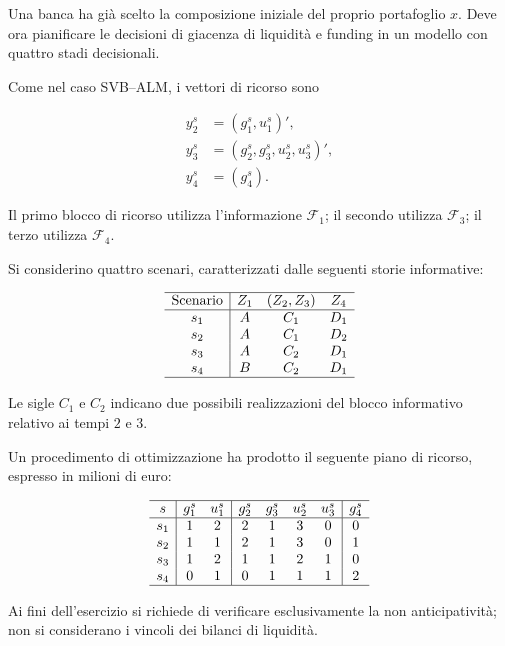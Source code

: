 \begin{exercise}

\label{ex:cap15-nonanticipativita-finanziaria}

Una banca ha gi\`a scelto la composizione
iniziale del proprio portafoglio $x$.
Deve ora pianificare le decisioni
di giacenza di liquidit\`a e funding
in un modello con quattro stadi decisionali.

Come nel caso SVB--ALM, i vettori
di ricorso sono

\[
\begin{aligned}
y_2^s
&=
(g_1^s,u_1^s)',
\\[4pt]
y_3^s
&=
(g_2^s,g_3^s,u_2^s,u_3^s)',
\\[4pt]
y_4^s
&=
(g_4^s).
\end{aligned}
\]

Il primo blocco di ricorso
utilizza l'informazione $\mathcal F_1$;
il secondo utilizza $\mathcal F_3$;
il terzo utilizza $\mathcal F_4$.

Si considerino quattro scenari,
caratterizzati dalle seguenti
storie informative:

\[
\begin{array}{c|ccc}
\hline
\text{Scenario}
&
Z_1
&
(Z_2,Z_3)
&
Z_4\\
\hline
s_1&A&C_1&D_1\\
s_2&A&C_1&D_2\\
s_3&A&C_2&D_1\\
s_4&B&C_2&D_1\\
\hline
\end{array}
\]

Le sigle $C_1$ e $C_2$ indicano
due possibili realizzazioni del blocco
informativo relativo ai tempi $2$ e $3$.

Un procedimento di ottimizzazione
ha prodotto il seguente piano
di ricorso, espresso in milioni di euro:

\[
\begin{array}{c|cc|cccc|c}
\hline
s
&
g_1^s&u_1^s
&
g_2^s&g_3^s&u_2^s&u_3^s
&
g_4^s\\
\hline
s_1&1&2&2&1&3&0&0\\
s_2&1&1&2&1&3&0&1\\
s_3&1&2&1&1&2&1&0\\
s_4&0&1&0&1&1&1&2\\
\hline
\end{array}
\]

Ai fini dell'esercizio si richiede
di verificare esclusivamente
la non anticipativit\`a;
non si considerano i vincoli
dei bilanci di liquidit\`a.


\end{exercise}

